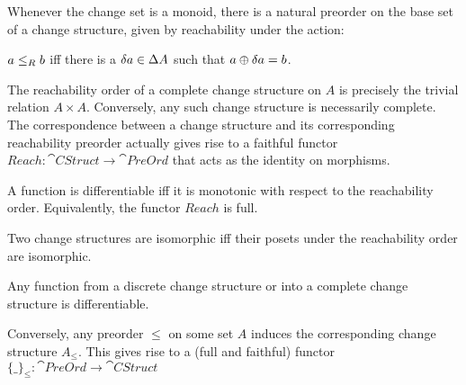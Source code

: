 Whenever the change set is a monoid, 
there is a natural preorder on the base set of a change structure, given by reachability
 under the action:
\begin{defn}
  $a \leq_R b$ iff there is a $\delta a \in \Delta A$ such that $a \oplus
  \delta a = b$.
\end{defn}

The reachability order of a complete change structure on $A$ is precisely the trivial relation
$A \times A$. Conversely, any such change structure is necessarily complete. The correspondence
between a change structure and its corresponding reachability preorder actually gives rise to
a faithful functor $Reach : \cat{CStruct} \rightarrow \cat{PreOrd}$ that acts as the identity
on morphisms.

\begin{prop}
  A function is differentiable iff it is monotonic with respect to the
  reachability order. Equivalently, the functor $Reach$ is full.
\end{prop}

\begin{corollary}
  Two change structures are isomorphic iff their posets under the reachability
  order are isomorphic.
\end{corollary}

\begin{corollary}
  Any function from a discrete change structure or into a complete change
  structure is differentiable.
\end{corollary}

Conversely, any preorder $\leq$ on some set $A$ induces the corresponding change structure
$A_\leq$. This gives rise to a (full and faithful) functor $\{\_\}_\leq : \cat{PreOrd} \rightarrow \cat{CStruct}$

